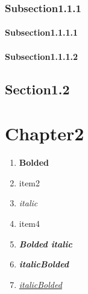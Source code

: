 \documentclass{report}
\begin{document}
    \subsection{Subsection1.1.1}

    \subsubsection{Subsection1.1.1.1}
    \subsubsection{Subsection1.1.1.2}

    \section{Section1.2}

    \chapter{Chapter2}

    \begin{enumerate}
        \item \textbf{Bolded}
        \item item2
        \item \textit{italic}
        \item item4
        \item \textbf{\textit{Bolded italic}}
        \item \textit{\textbf{italicBolded}}
        \item \textit{\underline{italicBolded}}
    \end{enumerate}
\end{document}
